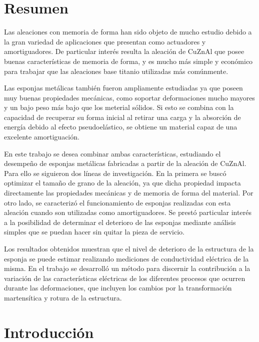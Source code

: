 \documentclass[a4paper,12pt,fleqn,twoside,openany]{book}
\begin{document}

\tableofcontents

\chapter*{Resumen}


Las aleaciones con memoria de forma han sido objeto de mucho estudio debido a la gran variedad de aplicaciones que presentan como actuadores y amortiguadores. De particular interés resulta la aleación de CuZnAl que posee buenas características de memoria de forma, y es mucho más simple y económico para trabajar que las aleaciones base titanio utilizadas más comúnmente.
 
Las esponjas metálicas también fueron ampliamente estudiadas ya que poseen muy buenas propiedades mecánicas, como soportar deformaciones mucho mayores y un bajo peso más bajo que los meterial sólidos. Si esto se combina con la capacidad de recuperar su forma inicial al retirar una carga y la absorción de energía debido al efecto pseudoelástico, se obtiene un material capaz de una excelente amortiguación.
 
En este trabajo se desea combinar ambas características, estudiando el desempeño de esponjas metálicas fabricadas a partir de la aleación de CuZnAl. Para ello se siguieron dos líneas de investigación. En la primera se buscó optimizar el tamaño de grano de la aleación, ya que dicha propiedad impacta directamente las propiedades mecánicas y de memoria de forma del material. Por otro lado, se caracterizó el funcionamiento de esponjas realizadas con esta aleación cuando son utilizadas como amortiguadores. Se prestó particular interés a la posibilidad de determinar el deterioro de las esponjas mediante análisis simples que se puedan hacer sin quitar la pieza de servicio.
 
Los resultados obtenidos muestran que el nivel de deterioro de la estructura de la esponja se puede estimar realizando mediciones de conductividad eléctrica de la misma. En el trabajo se desarrolló un método para discernir la contribución a la variación de las características eléctricas de los diferentes procesos que ocurren durante las deformaciones, que incluyen los cambios por la transformación martensítica y rotura de la estructura.


\chapter{Introducción}
\end{document}
